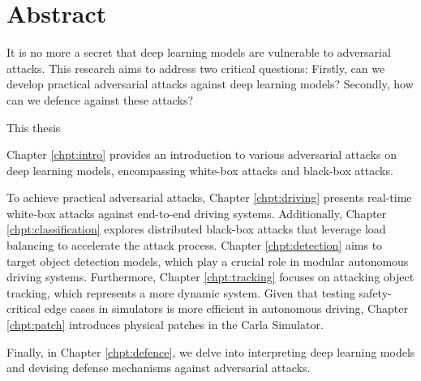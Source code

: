 \chapter*{Abstract}
It is no more a secret that deep learning models are vulnerable to adversarial attacks. This research aims to address two critical questions: Firstly, can we develop practical adversarial attacks against deep learning models? Secondly, how can we defence against these attacks?

This thesis

Chapter \ref{chpt:intro} provides an introduction to various adversarial attacks on deep learning models, encompassing white-box attacks and black-box attacks.

To achieve practical adversarial attacks, Chapter \ref{chpt:driving} presents real-time white-box attacks against end-to-end driving systems. Additionally, Chapter \ref{chpt:classification} explores distributed black-box attacks that leverage load balancing to accelerate the attack process. Chapter \ref{chpt:detection} aims to target object detection models, which play a crucial role in modular autonomous driving systems. Furthermore, Chapter \ref{chpt:tracking} focuses on attacking object tracking, which represents a more dynamic system. Given that testing safety-critical edge cases in simulators is more efficient in autonomous driving, Chapter \ref{chpt:patch} introduces physical patches in the Carla Simulator.

Finally, in Chapter \ref{chpt:defence}, we delve into interpreting deep learning models and devising defense mechanisms against adversarial attacks.
